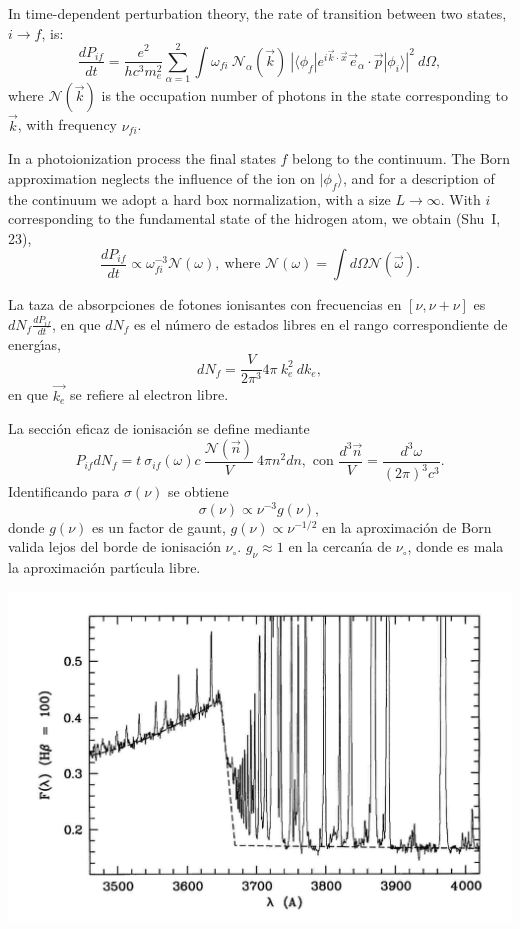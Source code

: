 \LogoOff
\bgclear
\pagecolor{white}

In time-dependent perturbation theory, the rate of transition between
two states, $i\rightarrow f $, is:
\[
\frac{dP_{if}}{dt} = \frac{e^2}{h c^3 m_e^2} \sum_{\alpha = 1}^2 \int
\omega_{fi} ~\mathcal{N}_{\alpha}(\vec{k}) ~| \langle \phi_f |
e^{i\vec{k}\cdot\vec{x} } \vec{e}_{\alpha} \cdot \vec{p} | \phi_i
\rangle |^2 ~d\Omega,
\]   
where $\mathcal{N}(\vec{k})$ is the occupation number of photons in
the state corresponding to  $\vec{k}$,
with frequency  $\nu_{fi}$.

In a photoionization process the final states $f$ belong to the
continuum. The Born approximation neglects the influence of the ion on
$|\phi_f\rangle$, and for a description of the continuum we adopt a hard
box normalization, with a size  $L \rightarrow
\infty$. With  $i$ corresponding to the fundamental state of the
hidrogen atom, we obtain (Shu~I, 23),
\[
\frac{dP_{if}}{dt} \propto \omega_{fi}^{-3} \mathcal{N}(\omega),
~\text{where } \mathcal{N}(\omega) = \int d\Omega
\mathcal{N}(\vec{\omega}) .
\]




La taza de absorpciones de fotones ionisantes con frecuencias en
$[\nu,\nu+\nu]$ es $ dN_f \frac{dP_{if}}{dt} $, en que $dN_f$ es el
n\'umero de estados libres en el rango correspondiente de
energ\'{\i}as,  
\[ 
dN_f = \frac{V}{2\pi^3} 4\pi~k_e^2 ~dk_e,
\]
en que $\vec{k_e}$ se refiere al electron libre.

La secci\'on eficaz de ionisaci\'on se define mediante
\[
P_{if} dN_f =  t~\sigma_{if}(\omega) c ~\frac{\mathcal{N}(\vec{n})}{V}
 ~4\pi n^2 dn , \text{~con } \frac{d^3\vec{n}}{V} =
\frac{d^3\omega}{(2\pi)^3 c^3}.
\]
Identificando para  $\sigma(\nu)$ se obtiene
\[
\sigma(\nu) \propto \nu^{-3}  g(\nu),
\]
donde $g(\nu)$ es un factor de gaunt, $g(\nu) \propto \nu^{-1/2} $ en
la aproximaci\'on de Born valida lejos del borde de ionisaci\'on
$\nu_\circ$. $g_\nu \approx 1 $ en la cercan\'{\i}a de $\nu_\circ$,
donde es mala la aproximaci\'on part\'{\i}cula libre. 



\begin{center}
  \includegraphics[width=25cm,height=!]{bj_liu.jpg}
\end{center}



